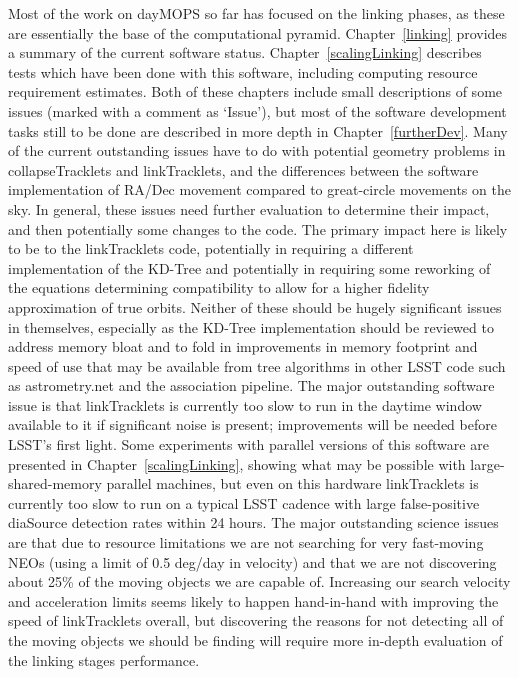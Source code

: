 Most of the work on dayMOPS so far has focused on the linking phases,
as these are essentially the base of the computational
pyramid. Chapter~\ref{linking} provides a summary of the current
software status. Chapter~\ref{scalingLinking} describes tests which have been done
with this software, including computing resource requirement
estimates. Both of these chapters include small descriptions of some
issues (marked with a comment as `Issue'), but most of the software
development tasks still to be done are described in more depth in
Chapter~\ref{furtherDev}. Many of the current outstanding issues
have to do with potential geometry problems in
collapseTracklets and linkTracklets, and the differences between the
software implementation of RA/Dec movement compared to great-circle
movements on the sky. In general, these issues need further evaluation
to determine their impact, and then potentially some changes to the
code. The primary impact here is likely to be to the linkTracklets
code, potentially in requiring a different implementation of the
KD-Tree and potentially in requiring some reworking of the equations
determining compatibility to allow for a higher fidelity approximation of true orbits. 
Neither of these should be hugely significant issues
in themselves, especially as the KD-Tree implementation should be
reviewed to address memory bloat and to fold in improvements in memory
footprint and speed of use that may
be available from tree algorithms in other LSST code such as
astrometry.net and the association pipeline. The major
outstanding software issue is that linkTracklets is currently too slow to
run in the daytime window available to it if significant noise is present; improvements will be needed
before LSST's first light. Some experiments with parallel versions of
this software are presented in Chapter~\ref{scalingLinking}, showing what may
be possible with large-shared-memory parallel machines, but even on
this hardware linkTracklets is currently too slow to run on a typical
LSST cadence with large false-positive diaSource detection rates
within 24 hours. 
The major outstanding science issues are that due to resource
limitations we are not searching for very fast-moving NEOs (using a
limit of 0.5 deg/day in velocity) and that we are not discovering
about 25\% of the moving objects we are capable of.  Increasing our
search velocity and acceleration limits seems likely to happen
hand-in-hand with improving the speed of linkTracklets overall, but
discovering the reasons for not detecting all of the moving objects we
should be finding will require more in-depth evaluation of the linking
stages performance. 


